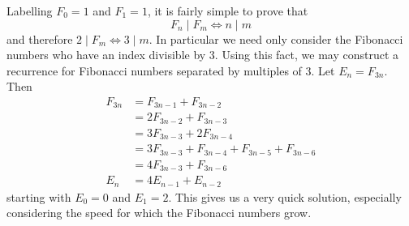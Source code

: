 Labelling $F_0=1$ and $F_1=1$, it is fairly simple to prove that
$$F_n\mid F_m\iff n\mid m$$
and therefore $2\mid F_m\iff 3\mid m$. In particular we need only consider the Fibonacci numbers who have an index divisible by 3.
Using this fact, we may construct a recurrence for Fibonacci numbers separated by multiples of 3. Let $E_n=F_{3n}$. Then
$$\begin{align*}
F_{3n}&=F_{3n-1}+F_{3n-2}\\
&=2F_{3n-2}+F_{3n-3}\\
&=3F_{3n-3}+2F_{3n-4}\\
&=3F_{3n-3}+F_{3n-4}+F_{3n-5}+F_{3n-6}\\
&=4F_{3n-3}+F_{3n-6}\\
E_n&=4E_{n-1}+E_{n-2}
\end{align*}$$
starting with $E_0=0$ and $E_1=2$. This gives us a very quick solution, especially considering the speed for which the
Fibonacci numbers grow. 